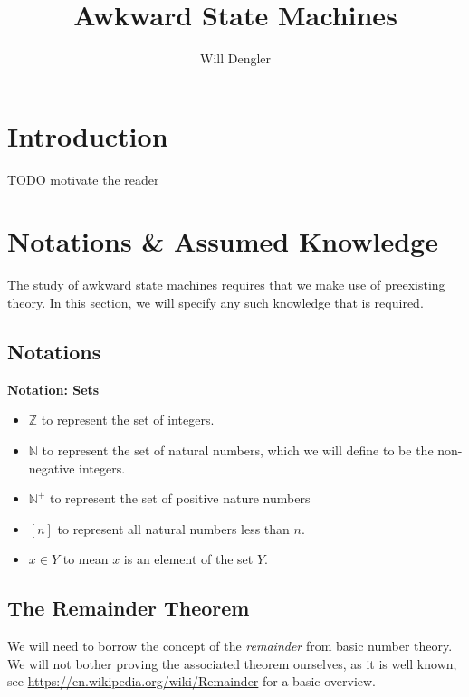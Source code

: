\documentclass[a4paper,12pt]{article}
\begin{document}
\title{Awkward State Machines}
\author{Will Dengler}
\maketitle

\section{Introduction}
TODO motivate the reader
  
\section{Notations \& Assumed Knowledge}
\label{sec:assumed_knowledge}
The study of awkward state machines requires that we make use of preexisting theory. In this section, we will specify any such knowledge that is required.


\subsection{Notations}
\begin{tcolorbox}
\textbf{Notation: Sets}
\begin{itemize}
\item $\mathbb{Z}$ to represent the set of integers.
\item $\mathbb{N}$ to represent the set of natural numbers, which we will define to be the non-negative integers.
\item $\mathbb{N^{+}}$ to represent the set of positive nature numbers
\item $[n]$ to represent all natural numbers less than $n$.
\item $x \in Y$ to mean $x$ is an element of the set $Y$.
\end{itemize}
\end{tcolorbox}
\label{notation:sets}


\subsection{The Remainder Theorem}
We will need to borrow the concept of the \textit{remainder} from basic number theory. We will not bother proving the associated theorem ourselves, as it is well known, see \url{https://en.wikipedia.org/wiki/Remainder} for a basic overview.\\
\end{document}
